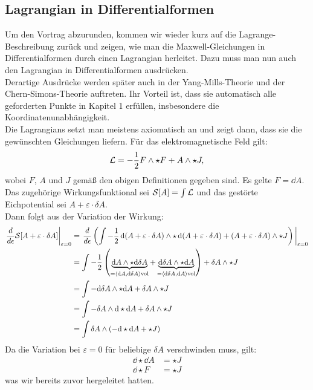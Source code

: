 \subsection{Lagrangian in Differentialformen}

Um den Vortrag abzurunden, kommen wir wieder kurz auf die Lagrange-Beschreibung zurück und zeigen, wie man die Maxwell-Gleichungen in Differentialformen durch einen Lagrangian herleitet. Dazu muss man nun auch den Lagrangian in Differentialformen ausdrücken. \\

Derartige Ausdrücke werden später auch in der Yang-Mills-Theorie und der Chern-Simons-Theorie auftreten. Ihr Vorteil ist, dass sie automatisch alle geforderten Punkte in Kapitel 1 erfüllen, insbesondere die Koordinatenunabhängigkeit. \\

Die Lagrangians setzt man meistens axiomatisch an und zeigt dann, dass sie die gewünschten Gleichungen liefern. Für das elektromagnetische Feld gilt:
\begin{align}
\mathcal{L} = - \frac{1}{2} F \wedge \star F + A \wedge \star J,
\end{align}
wobei $F$, $A$ und $J$ gemäß den obigen Definitionen gegeben sind. Es gelte $F = \dd A$. \\
Das zugehörige Wirkungsfunktional sei $\mathcal{S} [A]=\int \mathcal{L}$ und das gestörte Eichpotential sei $A + \varepsilon \cdot \delta A$. \\
Dann folgt aus der Variation der Wirkung: 
\begin{align*}
\eval{\frac{d}{d \epsilon} \mathcal{S}[A + \varepsilon \cdot \delta A]}_{\varepsilon=0} &= \eval{\frac{d}{d \epsilon} \left( \int - \frac{1}{2} \dd(A + \varepsilon \cdot \delta A) \w \star \dd(A + \varepsilon \cdot \delta A) + (A + \varepsilon \cdot \delta A) \w \star J \right)}_{\varepsilon=0} \\
&= \int - \frac{1}{2} \left(\underbrace{\dd A  \w \star \dd \delta A}_{=  \left< \dd A, \dd \delta A \right>\text{vol}}  + \underbrace{\dd \delta A \w \star \dd A}_{=  \left< \dd \delta A, \dd A \right>\text{vol}} \right) + \delta A \w \star J \\
&= \int - \dd \delta A \w \star \dd A + \delta A \w \star J  \\
&= \int - \delta A \w \dd \star \dd A + \delta A \w \star J \\
&= \int \delta A \w \left( - \dd \star \dd A + \star J \right)
\end{align*}
Da die Variation bei $\varepsilon = 0$ für beliebige $\delta A$ verschwinden muss, gilt: 
\begin{align*}
\dd \star \dd A &= \star J \\
\dd \star F &= \star J
\end{align*}
was wir bereits zuvor hergeleitet hatten.
